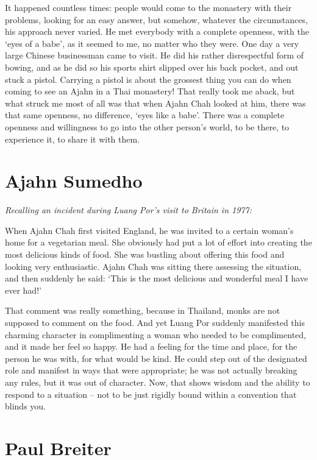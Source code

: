 It happened countless times: people would come to the monastery with
their problems, looking for an easy answer, but somehow, whatever the
circumstances, his approach never varied. He met everybody with a
complete openness, with the `eyes of a babe', as it seemed to me, no
matter who they were. One day a very large Chinese businessman came to
visit. He did his rather disrespectful form of bowing, and as he did so
his sports shirt slipped over his back pocket, and out stuck a pistol. 
Carrying a pistol is about the grossest thing you can do when coming to
see an Ajahn in a Thai monastery! That really took me aback, but what
struck me most of all was that when Ajahn Chah looked at him, there was
that same openness, no difference, `eyes like a babe'. There was a
complete openness and willingness to go into the other person's world, 
to be there, to experience it, to share it with them. 

\section{Ajahn Sumedho}

\emph{Recalling an incident during Luang Por's visit to Britain in 1977:}

When Ajahn Chah first visited England, he was invited to a certain
woman's home for a vegetarian meal. She obviously had put a lot of
effort into creating the most delicious kinds of food. She was bustling
about offering this food and looking very enthusiastic. Ajahn Chah was
sitting there assessing the situation, and then suddenly he said: `This
is the most delicious and wonderful meal I have ever had!'

That comment was really something, because in Thailand, monks are not
supposed to comment on the food. And yet Luang Por suddenly manifested
this charming character in complimenting a woman who needed to be
complimented, and it made her feel so happy. He had a feeling for the
time and place, for the person he was with, for what would be kind. He
could step out of the designated role and manifest in ways that were
appropriate; he was not actually breaking any rules, but it was out of
character. Now, that shows wisdom and the ability to respond to a
situation -- not to be just rigidly bound within a convention that
blinds you. 

\section{Paul Breiter}

